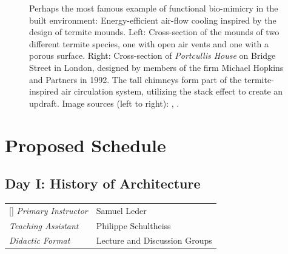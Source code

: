 \documentclass{article}
\begin{document}
\begin{figure}[ht!]
    \centering
    \caption{Perhaps the most famous example of functional bio-mimicry in the built environment: Energy-efficient air-flow cooling inspired by the design of termite mounds. Left: Cross-section of the mounds of two different termite species, one with open air vents and one with a porous surface. Right: Cross-section of \textit{Portcullis House} on Bridge Street in London, designed by members of the firm Michael Hopkins and Partners in 1992. The tall chimneys form part of the termite-inspired air circulation system, utilizing the stack effect to create an updraft. \newline Image sources (left to right): \cite{turner_beyond_2008}, \cite{davies_hopkins2_2001}.}
    \label{fig:porte_binet}
\end{figure}


\clearpage
\section{Proposed Schedule}
\subsection{Day I: History of Architecture}

\begin{NiceTabular}{W{l}{3cm}l}[]
\textit{Primary Instructor} & Samuel Leder \\
\textit{Teaching Assistant} & Philippe Schultheiss \\
\textit{Didactic Format} & Lecture and Discussion Groups
\end{NiceTabular}
\end{document}
